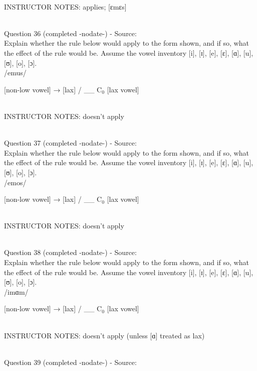 \documentclass[12pt]{article}
\begin{document}
~\\
INSTRUCTOR NOTES: applies; [ɛmɛs]


~\\

{\large Question 36} (completed -nodate-) - Source: \\

Explain whether the rule below would apply to the form shown, and if so, what the effect of the rule would be. Assume the vowel inventory [i], [ɪ], [e], [ɛ], [ɑ], [u], [ʊ], [o], [ɔ].\\

/emus/

{[non-low vowel]} →  {[lax]} / \_\_ C$_0$ {[lax vowel]}


~\\
INSTRUCTOR NOTES: doesn't apply


~\\

{\large Question 37} (completed -nodate-) - Source: \\

Explain whether the rule below would apply to the form shown, and if so, what the effect of the rule would be. Assume the vowel inventory [i], [ɪ], [e], [ɛ], [ɑ], [u], [ʊ], [o], [ɔ].\\

/emos/

{[non-low vowel]} →  {[lax]} / \_\_ C$_0$ {[lax vowel]}


~\\
INSTRUCTOR NOTES: doesn't apply


~\\

{\large Question 38} (completed -nodate-) - Source: \\

Explain whether the rule below would apply to the form shown, and if so, what the effect of the rule would be. Assume the vowel inventory [i], [ɪ], [e], [ɛ], [ɑ], [u], [ʊ], [o], [ɔ].\\

/imɑm/

{[non-low vowel]} →  {[lax]} / \_\_ C$_0$ {[lax vowel]}


~\\
INSTRUCTOR NOTES: doesn't apply (unless [ɑ] treated as lax)


~\\

{\large Question 39} (completed -nodate-) - Source: \\
\end{document}
